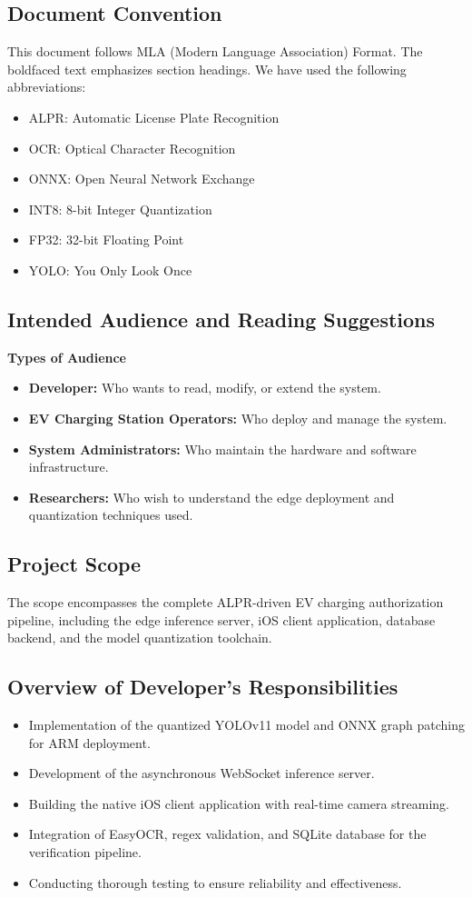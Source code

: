 \documentclass[11pt]{report}
\begin{document}
\subsection{Document Convention}
This document follows MLA (Modern Language Association) Format. The boldfaced text emphasizes section headings. We have used the following abbreviations:
\begin{itemize}
    \item ALPR: Automatic License Plate Recognition
    \item OCR: Optical Character Recognition
    \item ONNX: Open Neural Network Exchange
    \item INT8: 8-bit Integer Quantization
    \item FP32: 32-bit Floating Point
    \item YOLO: You Only Look Once
\end{itemize}

\subsection{Intended Audience and Reading Suggestions}
\textbf{Types of Audience}
\begin{itemize}
    \item \textbf{Developer:} Who wants to read, modify, or extend the system.
    \item \textbf{EV Charging Station Operators:} Who deploy and manage the system.
    \item \textbf{System Administrators:} Who maintain the hardware and software infrastructure.
    \item \textbf{Researchers:} Who wish to understand the edge deployment and quantization techniques used.
\end{itemize}

\subsection{Project Scope}
The scope encompasses the complete ALPR-driven EV charging authorization pipeline, including the edge inference server, iOS client application, database backend, and the model quantization toolchain.

\subsection{Overview of Developer's Responsibilities}
\begin{itemize}
    \item Implementation of the quantized YOLOv11 model and ONNX graph patching for ARM deployment.
    \item Development of the asynchronous WebSocket inference server.
    \item Building the native iOS client application with real-time camera streaming.
    \item Integration of EasyOCR, regex validation, and SQLite database for the verification pipeline.
    \item Conducting thorough testing to ensure reliability and effectiveness.
\end{itemize}
\end{document}
